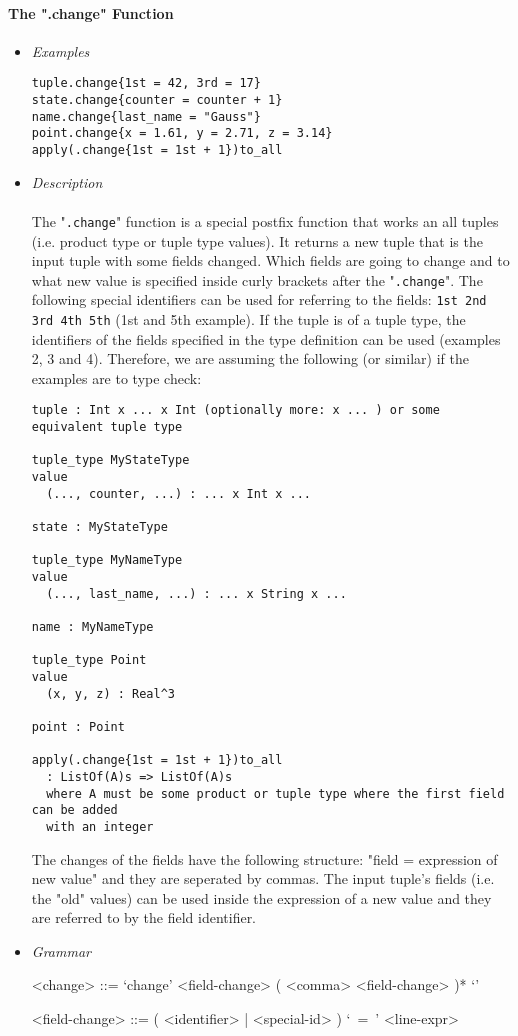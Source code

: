 \documentclass{article}
\begin{document}
\paragraph{The ".change" Function}

\begin{itemize}

\item \textit{Examples}

\begin{verbatim}
tuple.change{1st = 42, 3rd = 17}
state.change{counter = counter + 1} 
name.change{last_name = "Gauss"}
point.change{x = 1.61, y = 2.71, z = 3.14}
apply(.change{1st = 1st + 1})to_all
\end{verbatim}

\item \textit{Description} \\\\
The "\texttt{.change}" function is a special postfix function that works an all
tuples (i.e. product type or tuple type values). It returns a new tuple that is
the input tuple with some fields changed. Which fields are going to change and
to what new value is specified inside curly brackets after the
"\texttt{.change}". The following special identifiers can be used for referring
to the fields: \texttt{1st 2nd 3rd 4th 5th} (1st and 5th example). If the tuple
is of a tuple type, the identifiers of the fields specified in the type
definition can be used (examples 2, 3 and 4). Therefore, we are assuming the
following (or similar) if the examples are to type check:

\begin{verbatim}
tuple : Int x ... x Int (optionally more: x ... ) or some equivalent tuple type

tuple_type MyStateType
value
  (..., counter, ...) : ... x Int x ...

state : MyStateType

tuple_type MyNameType
value
  (..., last_name, ...) : ... x String x ...

name : MyNameType

tuple_type Point
value
  (x, y, z) : Real^3

point : Point

apply(.change{1st = 1st + 1})to_all
  : ListOf(A)s => ListOf(A)s
  where A must be some product or tuple type where the first field can be added 
  with an integer
\end{verbatim}
The changes of the fields have the following structure: "field = expression of
new value" and they are seperated by commas. The input tuple's fields (i.e. the
"old" values) can be used inside the expression of a new value and they are
referred to by the field identifier.
\item \textit{Grammar}

\begin{grammar}
<change> ::= `change{' <field-change> ( <comma> <field-change> )* `}'

<field-change> ::= ( <identifier> | <special-id> ) `\ =\ ' <line-expr>
\end{grammar} 

\end{itemize}
\end{document}
